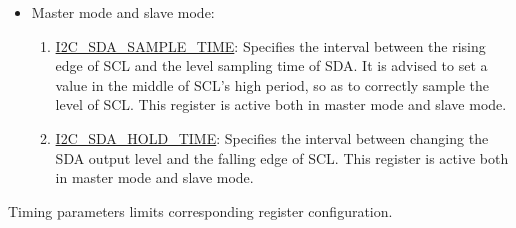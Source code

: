\documentclass[main\_\_EN.tex]{subfiles}
\begin{document}
\begin{itemize}
\begin{enumerate}
where 3 represents the amount of clock cycles required to synchronize the SCL. If the SCL filtering function is turned on, the delay caused by \hyperref[fielddesc:I2CSCLFILTERTHRES]{I2C\_SCL\_FILTER\_THRES} needs to be added. As the SCL low-to-high transition time represented by \hyperref[fielddesc:I2CSCLWAITHIGHPERIOD]{I2C\_SCL\_WAIT\_HIGH\_PERIOD} + 1 module clock can be affected by the pull-up resistor, IO drive capability, SCL line capacitance, etc., deviation may occur between the actual frequency of the test and the theoretical frequency. At this point, deviations can be reduced by adjusting the value of \hyperref[fielddesc:I2CSCLWAITHIGHPERIOD]{I2C\_SCL\_WAIT\_HIGH\_PERIOD}.
\end{enumerate}

\item Master mode and slave mode:

\begin{enumerate}

\item \hyperref[fielddesc:I2CSDASAMPLETIME]{I2C\_SDA\_SAMPLE\_TIME}:
Specifies the interval between the rising edge of SCL and the level sampling time of SDA. It is advised to set a value in the middle of SCL's high period, so as to correctly sample the level of SCL. This register is active both in master mode and slave mode.

\item \hyperref[fielddesc:I2CSDAHOLDTIME]{I2C\_SDA\_HOLD\_TIME}:
Specifies the interval between changing the SDA output level and the falling edge of SCL. This register is active both in master mode and slave mode.

\end{enumerate}
\end{itemize}

Timing parameters limits corresponding register configuration.
\end{document}

